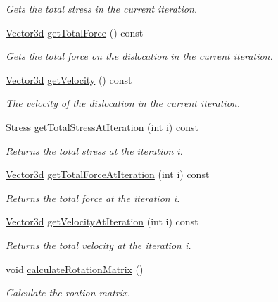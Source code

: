 \begin{DoxyCompactItemize}
\begin{DoxyCompactList}\small\item\em Gets the total stress in the current iteration. \end{DoxyCompactList}\item 
\hyperlink{classVector3d}{Vector3d} \hyperlink{classDislocation_a826a6aae1035b454cfc42db4bb863a4d}{get\-Total\-Force} () const 
\begin{DoxyCompactList}\small\item\em Gets the total force on the dislocation in the current iteration. \end{DoxyCompactList}\item 
\hyperlink{classVector3d}{Vector3d} \hyperlink{classDislocation_a74b8029dd76a9a43ac437aa144132a72}{get\-Velocity} () const 
\begin{DoxyCompactList}\small\item\em The velocity of the dislocation in the current iteration. \end{DoxyCompactList}\item 
\hyperlink{classStress}{Stress} \hyperlink{classDislocation_af57a21490312108d68540544596cc7a7}{get\-Total\-Stress\-At\-Iteration} (int i) const 
\begin{DoxyCompactList}\small\item\em Returns the total stress at the iteration i. \end{DoxyCompactList}\item 
\hyperlink{classVector3d}{Vector3d} \hyperlink{classDislocation_a2a693d6e986cf0d8bed2a55e6ce721bd}{get\-Total\-Force\-At\-Iteration} (int i) const 
\begin{DoxyCompactList}\small\item\em Returns the total force at the iteration i. \end{DoxyCompactList}\item 
\hyperlink{classVector3d}{Vector3d} \hyperlink{classDislocation_a6cf00cadeb4b42c4b3126d15137d1f04}{get\-Velocity\-At\-Iteration} (int i) const 
\begin{DoxyCompactList}\small\item\em Returns the total velocity at the iteration i. \end{DoxyCompactList}\item 
void \hyperlink{classDislocation_aa249f1f46486fd183757ed5049586e73}{calculate\-Rotation\-Matrix} ()
\begin{DoxyCompactList}\small\item\em Calculate the roation matrix. \end{DoxyCompactList}\item 

\end{DoxyCompactItemize}

